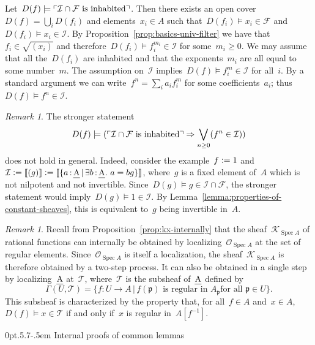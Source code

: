 \documentclass[10pt,reqno,a4paper]{amsbook}
\makeatletter
\theoremstyle{definition}
\theoremstyle{plain}
\theoremstyle{remark}
\newtheorem{rem}[defn]{Remark}
\newcommand{\F}{\mathcal{F}}
\renewcommand{\O}{\mathcal{O}}
\newcommand{\K}{\mathcal{K}}
\newcommand{\T}{\mathcal{T}}
\newcommand{\I}{\mathcal{I}}
\newcommand{\ppp}{\mathfrak{p}}
\let\oldul\ul
\renewcommand{\ul}[1]{\text{\oldul{$#1$}}}
\DeclareMathOperator{\Spec}{Spec}
\newcommand{\?}{\,{:}\,}
\renewcommand{\_}{\mathpunct{.}\,}
\newcommand{\speak}[1]{\ulcorner\text{\textnormal{#1}}\urcorner}
\newcommand{\brak}[1]{{\llbracket{#1}\rrbracket}}
\newcommand{\defeq}{\vcentcolon=}
\renewenvironment{proof}[1][\proofname]{\par
  \pushQED{\qed}%
  \normalfont \topsep6\p@\@plus6\p@\relax
  \trivlist
  \item[\hskip\labelsep
        \itshape
    #1\@addpunct{.}]\ignorespaces
}{%
  \popQED\endtrivlist\@endpefalse
}
\def\subsection{\@startsection{subsection}{2}%
  {0pt}{.5\linespacing\@plus.7\linespacing}{-.5em}%
  {\normalfont\bfseries}}
\makeatother
\begin{document}
\begin{proof}
Let~$D(f) \models \speak{$\I \cap \F$ is inhabited}$. Then there
exists an open cover~$D(f) = \bigcup_i D(f_i)$ and elements~$x_i \in A$ such
that~$D(f_i) \models x_i \in \F$ and~$D(f_i) \models x_i \in \I$. By
Proposition~\ref{prop:basics-univ-filter} we have that~$f_i \in \sqrt{(x_i)}$
and therefore~$D(f_i) \models f_i^{m_i} \in \I$ for some~$m_i \geq 0$. We may
assume that all the~$D(f_i)$ are inhabited and that the exponents~$m_i$ are all
equal to some number~$m$. The assumption on~$\I$ implies~$D(f) \models f_i^m
\in \I$ for all~$i$. By a standard argument we can write~$f^n = \sum_i a_i
f_i^m$ for some coefficients~$a_i$; thus~$D(f) \models f^n \in \I$.
\end{proof}

\begin{rem}The stronger statement
\[ D(f) \models (\speak{$\I \cap \F$ is inhabited} \Rightarrow \bigvee_{n \geq
0} (f^n \in \I)) \]
does not hold in general. Indeed, consider the example~$f \defeq 1$ and~$\I \defeq
\brak{(g)} \defeq \brak{\{ a\?\ul{A} \,|\, \exists b\?\ul{A}\_ a = bg \}}$,
where~$g$ is a fixed element of~$A$ which is not nilpotent and not invertible.
Since~$D(g) \models g \in \I \cap \F$, the stronger statement would imply~$D(g)
\models 1 \in \I$. By Lemma~\ref{lemma:properties-of-constant-sheaves}, this is
equivalent to~$g$ being invertible in~$A$.
\end{rem}

\begin{rem}Recall from Proposition~\ref{prop:kx-internally} that the
sheaf~$\K_{\Spec A}$ of rational functions can internally be obtained by
localizing~$\O_{\Spec A}$ at the set of regular elements. Since~$\O_{\Spec A}$
is itself a localization, the sheaf~$\K_{\Spec A}$ is therefore obtained by a
two-step process. It can also be obtained in a single step by
localizing~$\ul{A}$ at~$\T$, where~$\T$ is the subsheaf of~$\ul{A}$ defined
by
\[ \Gamma(U,\T) = \{ f : U \to A \,|\, \text{$f(\ppp)$ is regular in~$A_\ppp$
for all~$\ppp \in U$} \}. \]
This subsheaf is characterized by the property that, for all~$f \in A$ and~$x
\in A$,~$D(f) \models x \in \T$ if and only if~$x$ is regular in~$A[f^{-1}]$.
\end{rem}


\subsection{Internal proofs of common lemmas}
\label{sect:common-lemmas-transfer-principles}
\end{document}

